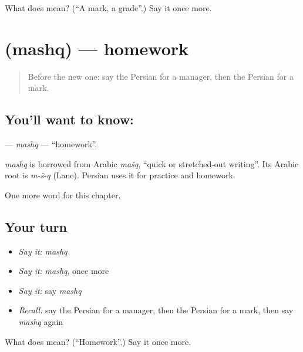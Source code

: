 \begin{tcolorbox}[breakable,colback=teal!4,colframe=teal!35!black,title={Before you move on}]
What does  mean? (\textquotedblleft{}A mark, a grade\textquotedblright{}.) Say it once more.
\end{tcolorbox}
\section[\texorpdfstring{\fa{مشق} (mashq)}{مشق (mashq)}]{ (mashq) — homework}

\label{lesson:FA-C215-mashq}



\begin{quote}
Before the new one: say the Persian for a manager, then the Persian for a mark.
\end{quote}

\subsection*{You'll want to know: }
\textbf{} — \emph{mashq} — \textquotedblleft{}homework\textquotedblright{}.

\begin{cousinweb}
\emph{mashq} is borrowed from Arabic \emph{mašq}, \textquotedblleft{}quick or stretched-out writing\textquotedblright{}. Its Arabic root is \emph{m-š-q} (Lane). Persian uses it for practice and homework.
\end{cousinweb}

\begin{grammarlens}[title={What you've built}]
One more word for this chapter.
\end{grammarlens}

\subsection*{Your turn}
\begin{itemize}
\raggedright
  \item \emph{Say it:} \emph{mashq}
  \item \emph{Say it:} \emph{mashq}, once more
  \item \emph{Say it:} say \emph{mashq}
  \item \emph{Recall:} say the Persian for a manager, then the Persian for a mark, then say \emph{mashq} again
\end{itemize}

\begin{tcolorbox}[breakable,colback=teal!4,colframe=teal!35!black,title={Before you move on}]
What does  mean? (\textquotedblleft{}Homework\textquotedblright{}.) Say it once more.
\end{tcolorbox}
